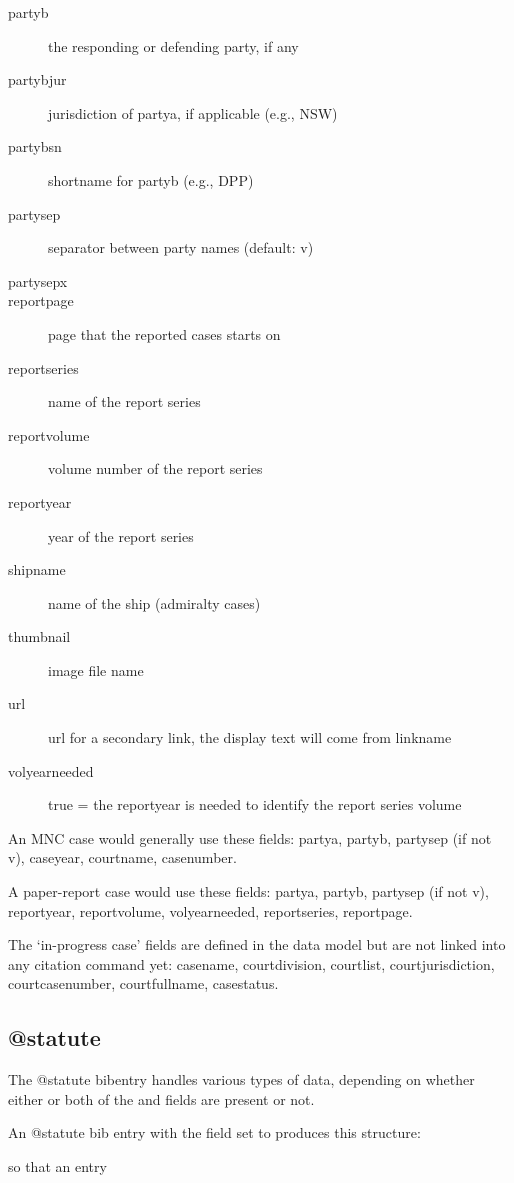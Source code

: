 \begin{description}
\item[partyb]the responding or defending party, if any
\item[partybjur]jurisdiction of partya, if applicable (e.g., NSW)
\item[partybsn]shortname for partyb (e.g., DPP)
\item[partysep]separator between party names (default: v)
\item[partysepx]
\item[reportpage]page that the reported cases starts on
\item[reportseries]name of the report series
\item[reportvolume]volume number of the report series
\item[reportyear]year of the report series
\item[shipname]name of the ship (admiralty cases)
\item[thumbnail]image file name
\item[url]url for a secondary link, the display text will come from linkname
\item[volyearneeded]true = the reportyear is needed to identify the report series volume
\end{description}

\p An MNC case would generally use these fields: {\ttfamily
partya, 
partyb, 
partysep (if not v), 
caseyear, 
courtname, 
casenumber}.

\p A paper-report case would use these fields: {\ttfamily
partya, 
partyb, 
partysep (if not v), 
reportyear, 
reportvolume, 
volyearneeded, 
reportseries, 
reportpage}. 

\p The `in-progress case' fields are defined in the data model but are not linked into any citation command yet: {\ttfamily
casename, 
courtdivision, 
courtlist, 
courtjurisdiction, 
courtcasenumber, 
courtfullname, 
casestatus}.

\subsection{@statute}%
\p The @statute bibentry handles various types of data, depending on whether either or both of the  and  fields are present or not.

\p An @statute bib entry with the  field set to  produces this structure:

\begin{myquotation}
\end{myquotation}
so that an entry

